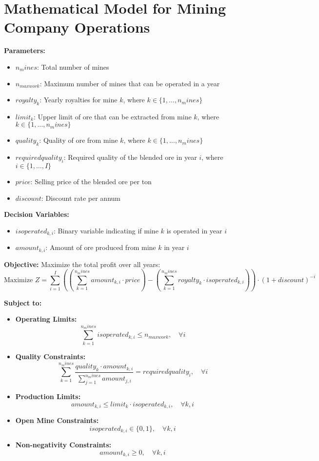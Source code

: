 \documentclass{article}
\begin{document}
\section*{Mathematical Model for Mining Company Operations}

\textbf{Parameters:}
\begin{itemize}
    \item $n_mines$: Total number of mines
    \item $n_{maxwork}$: Maximum number of mines that can be operated in a year
    \item $royalty_k$: Yearly royalties for mine $k$, where $k \in \{1, \ldots, n_mines\}$
    \item $limit_k$: Upper limit of ore that can be extracted from mine $k$, where $k \in \{1, \ldots, n_mines\}$
    \item $quality_k$: Quality of ore from mine $k$, where $k \in \{1, \ldots, n_mines\}$
    \item $requiredquality_i$: Required quality of the blended ore in year $i$, where $i \in \{1, \ldots, I\}$
    \item $price$: Selling price of the blended ore per ton
    \item $discount$: Discount rate per annum
\end{itemize}

\textbf{Decision Variables:}
\begin{itemize}
    \item $isoperated_{k,i}$: Binary variable indicating if mine $k$ is operated in year $i$
    \item $amount_{k,i}$: Amount of ore produced from mine $k$ in year $i$
\end{itemize}

\textbf{Objective:} 
Maximize the total profit over all years:
\[
\text{Maximize } Z = \sum_{i=1}^{I} \left( \left( \sum_{k=1}^{n_mines} amount_{k,i} \cdot price \right) - \left( \sum_{k=1}^{n_mines} royalty_k \cdot isoperated_{k,i} \right) \right) \cdot (1 + discount)^{-i}
\]

\textbf{Subject to:}
\begin{itemize}
    \item \textbf{Operating Limits:}
    \[
    \sum_{k=1}^{n_mines} isoperated_{k,i} \leq n_{maxwork} , \quad \forall i
    \]
    
    \item \textbf{Quality Constraints:}
    \[
    \sum_{k=1}^{n_mines} \frac{quality_k \cdot amount_{k,i}}{\sum_{j=1}^{n_mines} amount_{j,i}} = requiredquality_i , \quad \forall i
    \]
    
    \item \textbf{Production Limits:}
    \[
    amount_{k,i} \leq limit_k \cdot isoperated_{k,i} , \quad \forall k,i
    \]
    
    \item \textbf{Open Mine Constraints:}
    \[
    isoperated_{k,i} \in \{0, 1\} , \quad \forall k,i
    \]

    \item \textbf{Non-negativity Constraints:}
    \[
    amount_{k,i} \geq 0 , \quad \forall k,i
    \]
\end{itemize}
\end{document}
